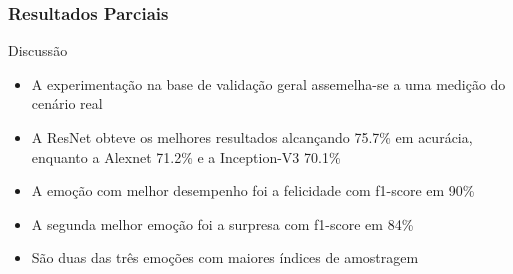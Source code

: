 \documentclass{beamer}
\begin{document}
\begin{frame}
\frametitle{Resultados Parciais}
 \begin{block}{Discussão}
\begin{itemize}
\item A experimentação na base de validação geral assemelha-se a uma medição do cenário real
\item A ResNet obteve os melhores resultados alcançando 75.7\% em acurácia, enquanto a Alexnet 71.2\% e a Inception-V3 70.1\%
\item A emoção com melhor desempenho foi a felicidade com f1-score em 90\%
\item A segunda melhor emoção foi a surpresa com f1-score em 84\%
\pause
\item São duas das três emoções com maiores índices de amostragem
\end{itemize}
\end{block}
\end{frame}
\end{document}
